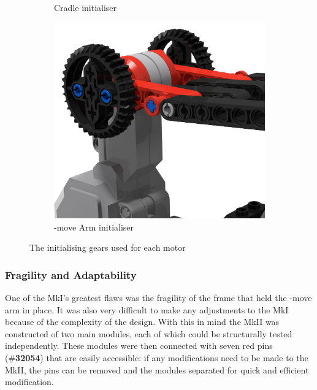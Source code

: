\documentclass{report}
\newcommand{\tbo}[1]{\textbf{#1}}
\newcommand{\legopiece}[1]{(\#\tbo{#1})}
\newcommand{\move}[1]{\uppercase{\texttt{\formatmovesnospace{#1}}}-move}
\begin{document}
\begin{figure}[H]
\begin{subfigure}[b]{0.25\textwidth}
			\caption{Cradle initialiser}
			\label{fig:rdrInitialiser2}
		\end{subfigure}
		\hspace{10mm}
		\begin{subfigure}[b]{0.25\textwidth}
			\includegraphics[width=\textwidth]{Resources/Images/rdrInitialiser3.png}
			\caption{\move{x} Arm initialiser}
			\label{fig:rdrInitialiser3}
		\end{subfigure}
		\caption{The initialising gears used for each motor}
		\label{fig:rdrInitialiser}
	\end{figure}
	
	\subsubsection{Fragility and Adaptability}
	
	One of the MkI's greatest flaws was the fragility of the frame that held the \move{x} arm in place. It was also very difficult to make any adjustments to the MkI because of the complexity of the design. With this in mind the MkII was constructed of two main modules, each of which could be structurally tested independently. These modules were then connected with seven red pins \legopiece{32054} that are easily accessible: if any modifications need to be made to the MkII, the pins can be removed and the modules separated for quick and efficient modification.
	
\end{document}
